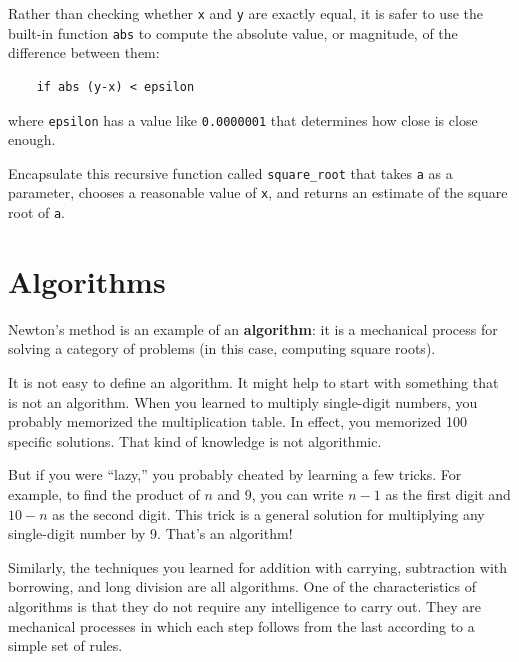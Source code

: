 \documentclass[10pt]{book}
\begin{document}

Rather than checking whether {\tt x} and {\tt y} are exactly equal, it
is safer to use the built-in function {\tt abs} to compute the
absolute value, or magnitude, of the difference between them:

\beforeverb
\begin{verbatim}
    if abs (y-x) < epsilon
\end{verbatim}
\afterverb
where \verb"epsilon" has a value like {\tt 0.0000001} that
determines how close is close enough.

\begin{ex}
\label{square_root}

Encapsulate this recursive function called \verb"square_root"
that takes {\tt a} as a parameter, chooses a reasonable
value of {\tt x}, and returns an estimate of the square root
of {\tt a}.
\end{ex}

\section{Algorithms}

Newton's method is an example of an {\bf algorithm}: it is a
mechanical process for solving a category of problems (in this
case, computing square roots).

It is not easy to define an algorithm.  It might help to start
with something that is not an algorithm.  When you learned
to multiply single-digit numbers, you probably memorized the
multiplication table.  In effect, you memorized 100 specific solutions.
That kind of knowledge is not algorithmic.

But if you were ``lazy,'' you probably cheated by learning a few
tricks.  For example, to find the product of $n$ and 9, you can
write $n-1$ as the first digit and $10-n$ as the second
digit.  This trick is a general solution for multiplying any
single-digit number by 9.  That's an algorithm!


Similarly, the techniques you learned for addition with carrying,
subtraction with borrowing, and long division are all algorithms.  One
of the characteristics of algorithms is that they do not require any
intelligence to carry out.  They are mechanical processes in which
each step follows from the last according to a simple set of rules.
\end{document}
